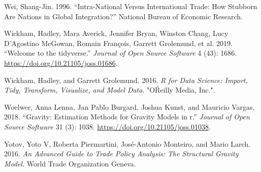 \documentclass[12pt,reqno,oneside,pdftex]{formato-puc/puctesis} %
\newenvironment{CSLReferences}
  {}
  {\par}
\begin{document}
\begin{CSLReferences}{1}{0}
\leavevmode\hypertarget{ref-wei1996intra}{}%
Wei, Shang-Jin. 1996. {``Intra-National Versus International Trade: How
Stubborn Are Nations in Global Integration?''} National Bureau of
Economic Research.

\leavevmode\hypertarget{ref-tidyverse}{}%
Wickham, Hadley, Mara Averick, Jennifer Bryan, Winston Chang, Lucy
D'Agostino McGowan, Romain François, Garrett Grolemund, et al. 2019.
{``Welcome to the {tidyverse}.''} \emph{Journal of Open Source Software}
4 (43): 1686. \url{https://doi.org/10.21105/joss.01686}.

\leavevmode\hypertarget{ref-wickham2016r}{}%
Wickham, Hadley, and Garrett Grolemund. 2016. \emph{R for Data Science:
Import, Tidy, Transform, Visualize, and Model Data}. "OŔeilly Media,
Inc.".

\leavevmode\hypertarget{ref-Woelver2018}{}%
Woelwer, Anna Lenna, Jan Pablo Burgard, Joshua Kunst, and Mauricio
Vargas. 2018. {``Gravity: Estimation Methods for Gravity Models in r.''}
\emph{Journal of Open Source Software} 31 (3): 1038.
\url{https://doi.org/10.21105/joss.01038}.

\leavevmode\hypertarget{ref-yotov2016advanced}{}%
Yotov, Yoto V, Roberta Piermartini, José-Antonio Monteiro, and Mario
Larch. 2016. \emph{An Advanced Guide to Trade Policy Analysis: The
Structural Gravity Model}. World Trade Organization Geneva.

\end{CSLReferences}
\end{document}
